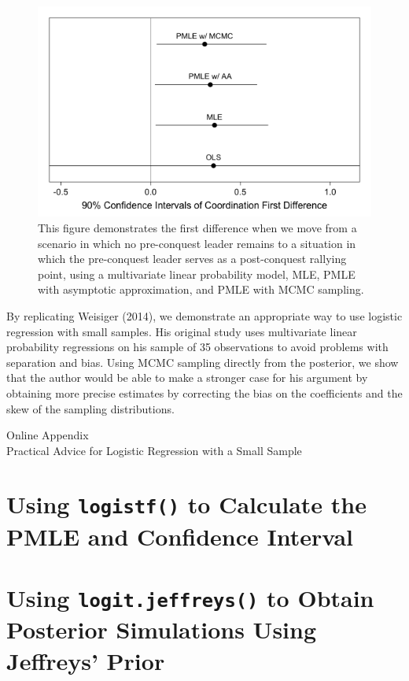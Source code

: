 \documentclass[12pt]{article}
\begin{document}
\begin{figure}[H]
\begin{center}
\includegraphics[width = \textwidth]{weisiger-coordfd.png}%
\caption{This figure demonstrates the first difference when we move from a scenario in which no pre-conquest leader remains to a situation in which the pre-conquest leader serves as a post-conquest rallying point, using a multivariate linear probability model, MLE, PMLE with asymptotic approximation, and PMLE with MCMC sampling.}\label{fig:coord-fd}
\end{center}
\end{figure}

By replicating Weisiger (2014), we demonstrate an appropriate way to use logistic regression with small samples. His original study uses multivariate linear probability regressions on his sample of 35 observations to avoid problems with separation and bias. Using MCMC sampling directly from the posterior, we show that the author would be able to make a stronger case for his argument by obtaining more precise estimates by correcting the bias on the coefficients and the skew of the sampling distributions. 

\newpage
\begin{appendix}
\begin{center}
{\LARGE Online Appendix}\\
{\large Practical Advice for Logistic Regression with a Small Sample}\\\vspace{2mm}
\end{center}


\section{Using \texttt{logistf()} to Calculate the PMLE and Confidence Interval}

\section{Using \texttt{logit.jeffreys()} to Obtain Posterior Simulations Using Jeffreys' Prior}

\end{appendix}
\end{document}
